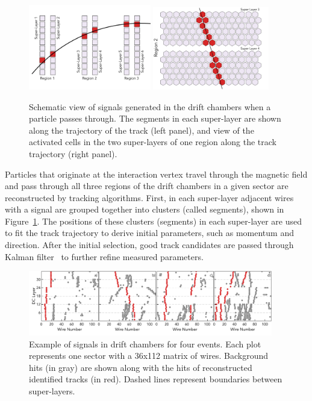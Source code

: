 \documentclass{webofc}
\begin{document}
\begin{figure}[!ht]
\begin{center}
 \includegraphics[width=2.1in]{images/dc_diagram.pdf}
 \includegraphics[width=2in]{images/region_2_diagram.pdf}
\caption {Schematic view of signals generated in the drift chambers when a particle passes through. 
The segments in each super-layer are shown along the trajectory of the track (left panel), and view 
of the activated cells in the two super-layers of one region along the track trajectory (right panel).}
 \label{dc:side_view}
 \end{center}
\end{figure}

Particles that originate at the interaction vertex travel through the magnetic field and pass through all 
three regions of the drift chambers in a given sector are reconstructed by tracking algorithms. First, 
in each super-layer adjacent wires with a signal are grouped together into clusters (called segments), 
shown in Figure~\ref{dc:side_view}. The positions of these clusters (segments) in each super-layer 
are used to fit the track trajectory to derive initial parameters, such as momentum and direction. 
After the initial selection, good track candidates are passed through Kalman filter~\cite{Kalman1960} 
 to further refine measured parameters.

\begin{figure}[!ht]
\begin{center}
 \includegraphics[width=4.2in]{images/figure_dc_examples.pdf}
\caption {Example of signals in drift chambers for four events. Each plot represents one sector with a 
36x112 matrix of wires. Background hits (in gray) are shown along with the hits of reconstructed 
identified tracks (in red). Dashed lines represent boundaries between super-layers.}
 \label{dc:events_sector}
 \end{center}
\end{figure}
\end{document}
